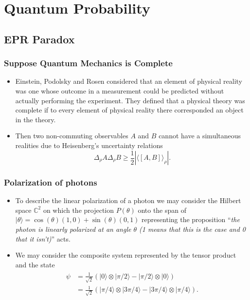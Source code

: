 \documentclass{beamer}
\theoremstyle{definition}
\begin{document}
\section{Quantum Probability}

\subsection{EPR Paradox}

\begin{frame}

\frametitle{Suppose Quantum Mechanics is Complete}

\begin{itemize}

\item Einstein, Podolsky and Rosen considered that an element of physical reality was one whose outcome in a measurement could be predicted without actually performing the experiment. They defined that a physical theory was complete if to every element of physical reality there corresponded an object in the theory.

\item Then two non-commuting observables $A$ and $B$ cannot have a simultaneous realities due to Heisenberg's uncertainty relations
\begin{equation}
\Delta_\rho A \Delta_\rho B \geq \frac{1}{2}|\langle[A,B]\rangle_\rho|.
\end{equation}

\end{itemize}

\end{frame}

\begin{frame}

\frametitle{Polarization of photons}

\begin{itemize}

\item To describe the linear polarization of a photon we may consider the Hilbert space $\mathbb{C}^2$ on which the projection $P(\theta)$ onto the span of $|\theta\rangle=\cos(\theta)(1,0)+\sin(\theta)(0,1)$ representing the proposition ``\textit{the photon is linearly polarized at an angle $\theta$ (1 means that this is the case and 0 that it isn't)}'' acts.

\item We may consider the composite system represented by the tensor product and the state 
\begin{align}
\begin{split}
\psi&=\frac{1}{\sqrt{2}}\left(|0\rangle\otimes|\pi/2\rangle-|\pi/2\rangle\otimes|0\rangle\right)\\
&=\frac{1}{\sqrt{2}}\left(|\pi/4\rangle\otimes|3\pi/4\rangle-|3\pi/4\rangle\otimes|\pi/4\rangle\right).
\end{split}
\end{align} 

\end{itemize}

\end{frame}
\end{document}
